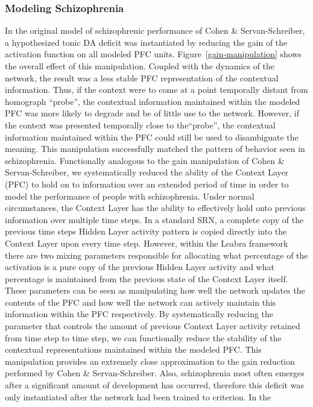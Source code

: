 \subsubsection{Modeling Schizophrenia}
In the original model of schizophrenic performance of Cohen \& Servan-Schreiber, a hypothesized tonic DA deficit was instantiated by reducing the gain of the activation function on all modeled PFC units. Figure~\ref{gain-manipulation} shows the overall effect of this manipulation.  Coupled with the dynamics of the network, the result was a less stable PFC representation of the contextual information.  Thus, if the context were to come at a point temporally distant from homograph ``probe'', the contextual information maintained within the modeled PFC was more likely to degrade and be of little use to the network.  However, if the context was presented temporally close to the``probe'', the contextual information maintained within the PFC could still be used to disambiguate the meaning.  This manipulation successfully matched the pattern of behavior seen in schizophrenia.  Functionally analogous to the gain manipulation of Cohen \& Servan-Schreiber, we systematically reduced the ability of the Context Layer (PFC) to hold on to information over an extended period of time in order to model the performance of people with schizophrenia.  Under normal circumstances, the Context Layer has the ability to effectively hold onto previous information over multiple time steps.  In a standard SRN, a complete copy of the previous time steps Hidden Layer activity pattern is copied directly into the Context Layer upon every time step.  However, within the Leabra framework there are two mixing parameters responsible for allocating what percentage of the activation is a pure copy of the previous Hidden Layer activity and what percentage is maintained from the previous state of the Context Layer itself.  These parameters can be seen as manipulating how well the network updates the contents of the PFC and how well the network can actively maintain this information within the PFC respectively.  By systematically reducing the parameter that controls the amount of previous Context Layer activity retained from time step to time step, we can functionally reduce the stability of the contextual representations maintained within the modeled PFC.  This manipulation provides an extremely close approximation to the gain reduction performed by Cohen \& Servan-Schreiber.   Also, schizophrenia most often emerges after a significant amount of development has occurred, therefore this deficit was only instantiated after the network had been trained to criterion.  In the 
